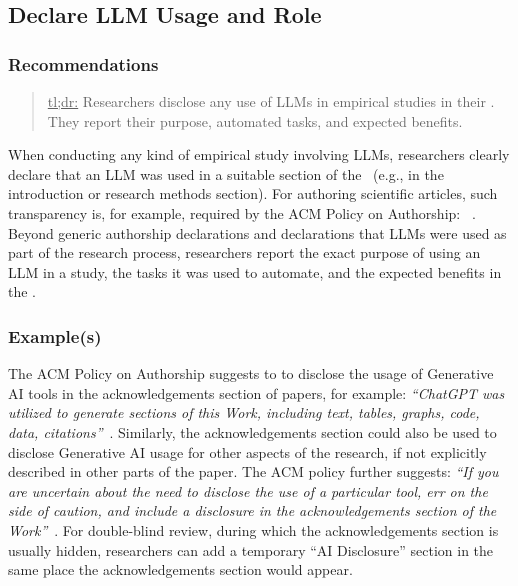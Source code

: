 



\subsection{Declare LLM Usage and Role}

\subsubsection{Recommendations}

\begin{quote}
\underline{tl;dr:} Researchers \must disclose any use of LLMs in empirical studies in their \paper. They \should report their purpose, automated tasks, and expected benefits.
\end{quote}

When conducting any kind of empirical study involving LLMs, researchers \must clearly declare that an LLM was used in a suitable section of the \paper~(e.g., in the introduction or research methods section).
For authoring scientific articles, such transparency is, for example, required by the ACM Policy on Authorship: ~\cite{ACM2023}.
Beyond generic authorship declarations and declarations that LLMs were used as part of the research process, researchers \should report the exact purpose of using an LLM in a study, the tasks it was used to automate, and the expected benefits in the \paper.


\subsubsection{Example(s)}

The ACM Policy on Authorship suggests to to disclose the usage of Generative AI tools in the acknowledgements section of papers, for example: \emph{``ChatGPT was utilized to generate sections of this Work, including text, tables, graphs, code, data, citations''}~\cite{ACM2023}. 
Similarly, the acknowledgements section could also be used to disclose Generative AI usage for other aspects of the research, if not explicitly described in other parts of the paper.
The ACM policy further suggests: \emph{``If you are uncertain ­about the need to disclose the use of a particular tool, err on the side of caution, and include a disclosure in the acknowledgements section of the Work''}~\cite{ACM2023}.
For double-blind review, during which the acknowledgements section is usually hidden, researchers can add a temporary ``AI Disclosure'' section in the same place the acknowledgements section would appear. 

